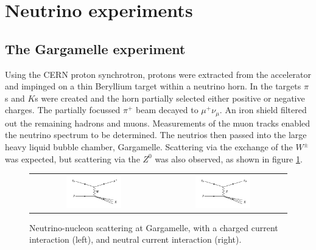 \clearpage

\section{Neutrino experiments}

\subsection{The Gargamelle experiment}

Using the CERN proton synchrotron, protons were extracted from the accelerator and impinged on a thin Beryllium target within a neutrino horn.  In the targets $\pi$s and $K$s were created and the horn partially selected either positive or negative charges.  The partially focussed $\pi^+$ beam decayed to $\mu^+ \nu_{\mu}$.  An iron shield filtered out the remaining hadrons and muons.  Measurements of the muon tracks enabled the neutrino spectrum to be determined.  The neutrios then passed into the large heavy liquid bubble chamber, Gargamelle.  Scattering via the exchange of the $W^{\pm}$ was expected, but scattering via the $Z^0$ was also observed, as shown in figure \ref{fig:ch3_NumPToMuHad}.

\begin{figure}[!htb]
  \begin{center}
    \begin{tabular}{cc}
      \includegraphics[width=0.45\textwidth]{images/web_feynman/image_9.png} &
      \includegraphics[width=0.45\textwidth]{images/web_feynman/image_10.png}
    \end{tabular}
    \caption[Neutrino-nucleon scattering at Gargamelle]{Neutrino-nucleon scattering at Gargamelle, with a charged current interaction (left), and neutral current interaction (right).}
    \label{fig:ch3_NumPToMuHad}
  \end{center}
\end{figure}

